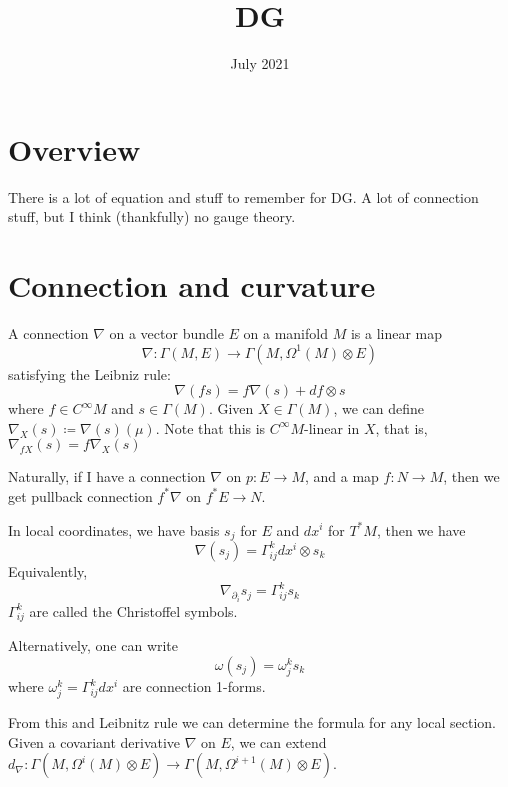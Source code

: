 \documentclass[main.tex]{subfiles}
\title{DG}
\date{July 2021}
\begin{document}
\maketitle


\section{Overview}
There is a lot of equation and stuff to remember for DG. A lot of connection stuff, but I think (thankfully) no gauge theory.

\section{Connection and curvature}


\begin{definition}
A connection $\nabla$ on a vector bundle $E$ on a manifold $M$ is a linear map 
$$
\nabla: \Gamma(M, E) \rightarrow \Gamma(M, \Omega^1(M) \otimes E )
$$
satisfying the Leibniz rule:
$$
\nabla(f s) = f \nabla(s) + df \otimes s
$$
where $f \in C^{\infty}M$ and $s \in \Gamma(M)$. Given $X \in \Gamma(M)$, we can define 
$\nabla_X(s) \coloneqq \nabla(s) (\mu)$. Note that this is $C^{\infty}M$-linear in $X$, that is, $\nabla_{fX}(s) = f \nabla_{X}(s)$
\end{definition}

Naturally, if I have a connection $\nabla$ on $p: E \rightarrow M$, and a map $f : N \rightarrow M$, then we get pullback connection $f^*\nabla$ on $f^*E \rightarrow N$.

In local coordinates, we have basis $s_j$ for $E$ and $dx^i$ for $T^*M$, then we have 
$$
\nabla(s_j) = \Gamma_{ij}^k dx^i \otimes s_k
$$
Equivalently, 
$$
\nabla_{\partial_i} s_j = \Gamma_{ij}^k s_k
$$
$\Gamma_{ij}^k$ are called the Christoffel symbols.

Alternatively, one can write
$$
\omega(s_j) = \omega_j ^k s_k
$$
where $\omega_j ^k = \Gamma_{ij}^k dx^i$ are connection 1-forms.

From this and Leibnitz rule we can determine the formula for any local section.
Given a covariant derivative $\nabla$ on $E$, we can extend $d_\nabla: \Gamma(M, \Omega^i(M) \otimes E) \rightarrow \Gamma(M, \Omega^{i+1}(M) \otimes E)$. 
\end{document}
